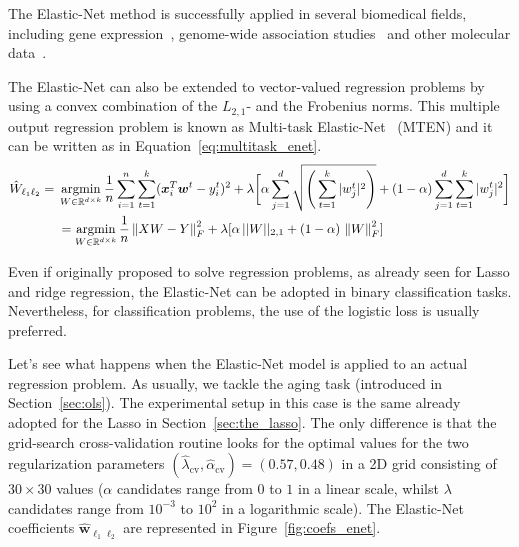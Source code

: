 			The Elastic-Net method is successfully applied in several biomedical fields, including gene expression~\cite{jacob2015robust, de2009regularized}, genome-wide association studies~\cite{waldmann2013evaluation} and other molecular data~\cite{aben2016tandem, jacob2015robust}.


			The Elastic-Net can also be extended to vector-valued regression problems by using a convex combination of the $L_{2,1}$- and the Frobenius norms. This multiple output regression problem is known as Multi-task Elastic-Net~\cite{chen2012adaptive} (\ac{MTEN}) and it can be written as in Equation~\eqref{eq:multitask_enet}.
			\begin{equation} \label{eq:multitask_enet}
				\begin{aligned}
					\hat W_{\ell_1\ell_2}={} & \mathop{\mathrm{argmin}}\limits_{W \in \mathbb{R}^{d \times k}} \frac{1}{n} \sum_{i=1}^n \sum_{t=1}^k (\bm{x}_i^T\bm{w}^t - y_i^t)^2 + \lambda \bigg[ \alpha \sum_{j=1}^d \sqrt{\Bigg(\sum_{t=1}^k |w_j^t|^2\Bigg)} + (1-\alpha)  \sum_{j=1}^d \sum_{t=1}^k |w_j^t|^2 \bigg] \\
					& =	\mathop{\mathrm{argmin}}\limits_{W \in \mathbb{R}^{d \times k}} \frac{1}{n} \left\lVert XW - Y\right\rVert_F^2 + \lambda [\alpha\,||W||_{2,1} + (1-\alpha)\,\left\lVert W\right\rVert_F^2]
				\end{aligned}
   		    \end{equation}

			Even if originally proposed to solve regression problems, as already seen for Lasso and ridge regression, the Elastic-Net can be adopted in binary classification tasks. Nevertheless, for classification problems, the use of the logistic loss is usually preferred.

			Let's see what happens when the Elastic-Net model is applied to an actual regression problem. As usually, we tackle the aging task (introduced in Section~\ref{sec:ols}).
			The experimental setup in this case is the same already adopted for the Lasso in Section~\ref{sec:the_lasso}. The only difference is that the grid-search cross-validation routine looks for the optimal values for the two regularization parameters $(\hat \lambda_{\text{cv}}, \hat \alpha_{\text{cv}}) = (0.57, 0.48)$ in a 2D grid consisting of $30 \times 30$ values ($\alpha$ candidates range from $0$ to $1$ in a linear scale, whilst $\lambda$ candidates range from $10^{-3}$ to $10^{2}$ in a logarithmic scale). The Elastic-Net coefficients $\bm{\hat w}_{\ell_1\ell_2}$ are represented in Figure~\ref{fig:coefs_enet}.

